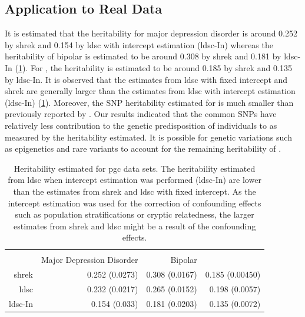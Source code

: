 		\subsection{Application to Real Data}
		It is estimated that the heritability for major depression disorder is around 0.252 by \gls{shrek} and 0.154 by \gls{ldsc} with intercept estimation (\gls{ldsc}-In) whereas the heritability of bipolar is estimated to be around 0.308 by \gls{shrek} and 0.181 by \gls{ldsc}-In (\cref{tab:realData}).
		For , the heritability is estimated to be around 0.185 by \gls{shrek} and 0.135 by \gls{ldsc}-In.
		It is observed that the estimates from \gls{ldsc} with fixed intercept and \gls{shrek} are generally larger than the estimates from \gls{ldsc} with intercept estimation (\gls{ldsc}-In) (\cref{tab:realData}).
		Moreover, the \gls{SNP} heritability estimated for  is much smaller than previously reported by \citet{Bulik-Sullivan2015}.
		Our results indicated that the common \glspl{SNP} have relatively less contribution to the genetic predisposition of individuals to  as measured by the heritability estimated. 
		It is possible for genetic variations such as epigenetics and rare variants to account for the remaining heritability of .
		\begin{table}[H]
			\centering
			\begin{tabular}{rrrr}
				\toprule
				 \\
				& Major Depression Disorder & Bipolar & \Glng{scz}\\
				\midrule
				\gls{shrek} & 0.252 (0.0273)& 0.308 (0.0167) & 0.185 (0.00450) \\ 
				\gls{ldsc} & 0.232 (0.0217) & 0.265 (0.0152) & 0.198 (0.0057) \\				\gls{ldsc}-In & 0.154 (0.033) & 0.181 (0.0203) & 0.135 (0.0072) \\
				\bottomrule
			\end{tabular}
			\caption[Heritability Estimated for PGC Data Sets]{
				Heritability estimated for \gls{pgc} data sets.
				The heritability estimated from \gls{ldsc} when intercept estimation was performed (\gls{ldsc}-In) are lower than the estimates from \gls{shrek} and \gls{ldsc} with fixed intercept.
				As the intercept estimation was used for the correction of confounding effects such as population stratifications or cryptic relatedness, the larger estimates from \gls{shrek} and \gls{ldsc} might be a result of the confounding effects.
			}
			\label{tab:realData}
		\end{table}
		
